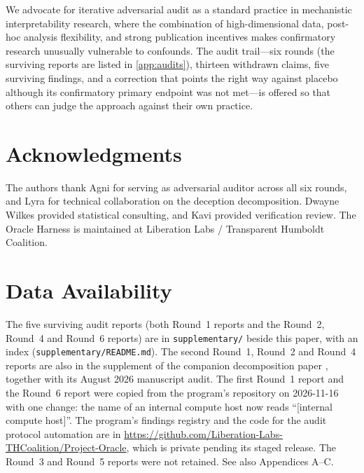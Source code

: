 \documentclass[11pt,letterpaper]{article}
\begin{document}
We advocate for iterative adversarial audit as a standard practice in mechanistic interpretability
research, where the combination of high-dimensional data, post-hoc analysis flexibility, and strong
publication incentives makes confirmatory research unusually vulnerable to confounds. The audit
trail---six rounds (the surviving reports are listed in \cref{app:audits}), thirteen withdrawn claims,
five surviving findings, and a correction that points the right way against placebo although its
confirmatory primary endpoint was not met---is offered so that others can judge the approach against
their own practice.

\section*{Acknowledgments}

The authors thank Agni for serving as adversarial auditor across all six rounds, and Lyra for
technical collaboration on the deception decomposition. Dwayne Wilkes provided statistical consulting, and Kavi provided verification review.
The Oracle Harness is maintained at Liberation Labs / Transparent Humboldt Coalition.

\section*{Data Availability}

The five surviving audit reports (both Round~1 reports and the Round~2, Round~4 and Round~6 reports)
are in \texttt{supplementary/} beside this paper, with an index (\texttt{supplementary/README.md}).
The second Round~1, Round~2 and Round~4 reports are also in the supplement of the companion
decomposition paper \cite{cc2026composites}, together with its August 2026 manuscript audit. The
first Round~1 report and the Round~6 report were copied from the program's repository on 2026-11-16
with one change: the name of an internal compute host now reads ``[internal compute host]''. The
program's findings registry and the code for the audit protocol automation are in
\url{https://github.com/Liberation-Labs-THCoalition/Project-Oracle}, which is private pending its
staged release. The Round~3 and Round~5 reports were not retained.
See also Appendices A--C.
\end{document}
